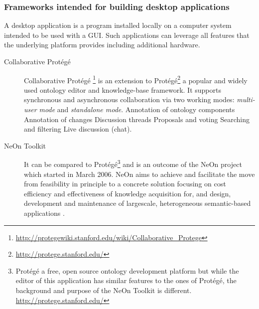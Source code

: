 \subsubsection{Frameworks intended for building desktop applications}
A desktop application is a program installed locally on a computer system
intended to be used with a GUI.
Such applications can leverage all features that the underlying platform
provides including additional hardware.
\begin{description}
        \item[Collaborative Protégé]
                                Collaborative Protégé
                \footnote{\url{http://protegewiki.stanford.edu/wiki/Collaborative_Protege}}
                is an extension to
                Protégé\footnote{\url{http://protege.stanford.edu/}} a popular 
                and widely used ontology editor and knowledge-base framework.
                It supports synchronous and asynchronous collaboration
                via two working modes: \emph{multi-user mode} and \emph{standalone mode}.
                Annotation of ontology components
                Annotation of changes
                Discussion threads
                Proposals and voting
                Searching and filtering
                Live discussion (chat).
        \item[NeOn Toolkit]
                It can be compared to Protégé\footnote{Protégé a free,
                open source ontology development platform but
                while the editor of this application has similar features
                to the ones of Protégé, the background and purpose of
                the NeOn Toolkit is different.
                                \url{http://protege.stanford.edu/}} and is an outcome of the
                                NeOn project which started in March 2006. NeOn
                                aims to achieve and facilitate the move from feasibility in
                                principle to a concrete solution focusing on cost efficiency
                                and effectiveness of knowledge acquisition for, and
                                design, development and maintenance of largescale,
                                heterogeneous semantic-based applications \cite{neonAnnex2006}.
\end{description}

